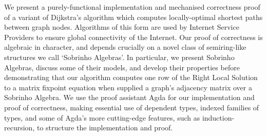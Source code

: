 We present a purely-functional implementation and mechanised correctness proof of a variant of Dijkstra's algorithm which computes locally-optimal shortest paths between graph nodes.
Algorithms of this form are used by Internet Service Providers to ensure global connectivity of the Internet.
Our proof of correctness is algebraic in character, and depends crucially on a novel class of semiring-like structures we call `Sobrinho Algebras'.
In particular, we present Sobrinho Algebras, discuss some of their models, and develop their properties before demonstrating that our algorithm computes one row of the Right Local Solution to a matrix fixpoint equation when supplied a graph's adjacency matrix over a Sobrinho Algebra.
We use the proof assistant Agda for our implementation and proof of correctness, making essential use of dependent types, indexed families of types, and some of Agda's more cutting-edge features, such as induction-recursion, to structure the implementation and proof.

